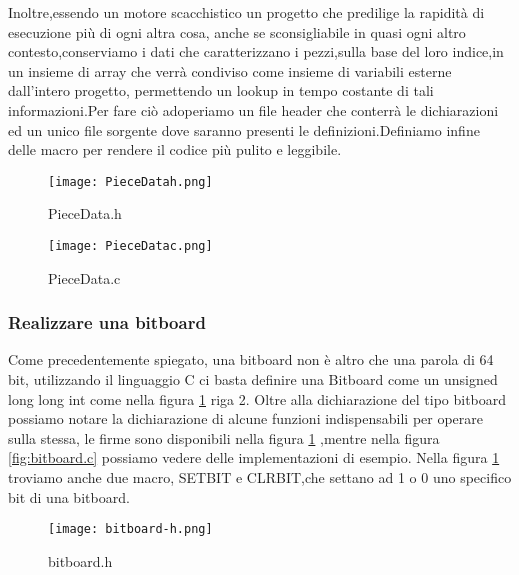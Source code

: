 Inoltre,essendo un motore scacchistico un progetto che predilige la rapidità di esecuzione più di ogni altra cosa,
anche se sconsigliabile in quasi ogni altro contesto,conserviamo i dati che caratterizzano i pezzi,sulla base del loro indice,in un insieme di array che verrà condiviso come insieme di variabili
esterne dall'intero progetto, permettendo un lookup in tempo costante di tali informazioni.Per fare ciò adoperiamo un file header che conterrà le dichiarazioni ed un unico file sorgente dove saranno presenti le
definizioni.Definiamo infine delle macro per rendere il codice più pulito e leggibile.
\begin{figure}[h]
    \centering
    \begin{minipage}[t]{0.4\textwidth}
        \texttt{[image: PieceDatah.png]}
        \caption{PieceData.h}
    \end{minipage}
    \hfill
    \begin{minipage}[t]{0.4\textwidth}
        \texttt{[image: PieceDatac.png]}
        \caption{PieceData.c}
    \end{minipage}
\end{figure}



\subsubsection{Realizzare una bitboard}
Come precedentemente spiegato, una bitboard non è altro che una parola di 64 bit,
utilizzando il linguaggio C ci basta definire una Bitboard come un unsigned long long int come nella figura \ref{bitboard.h} riga 2.
Oltre alla dichiarazione del tipo bitboard possiamo notare la dichiarazione di alcune funzioni indispensabili per operare sulla stessa,
le firme sono disponibili nella figura \ref{bitboard.h} ,mentre nella figura \ref{fig:bitboard.c} possiamo vedere delle implementazioni di esempio.
Nella figura \ref{bitboard.h} troviamo anche due macro, SETBIT e CLRBIT,che settano ad 1 o 0 uno specifico bit di una bitboard.



\vfill
\begin{figure}[!ht]
    \texttt{[image: bitboard-h.png]}
    \caption{ bitboard.h }
    \label{bitboard.h}
\end{figure}

